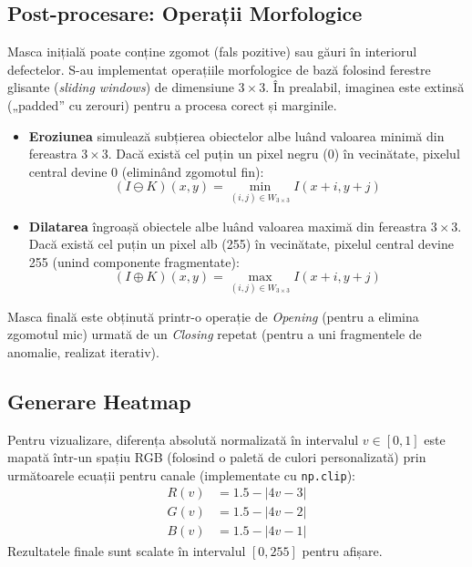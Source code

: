 \documentclass[12pt, a4paper]{article}
\begin{document}
\subsection{Post-procesare: Operații Morfologice}
Masca inițială poate conține zgomot (fals pozitive) sau găuri în interiorul defectelor. S-au implementat operațiile morfologice de bază folosind ferestre glisante (\textit{sliding windows}) de dimensiune $3 \times 3$. În prealabil, imaginea este extinsă („padded” cu zerouri) pentru a procesa corect și marginile.
\begin{itemize}
    \item \textbf{Eroziunea} simulează subțierea obiectelor albe luând valoarea minimă din fereastra $3 \times 3$. Dacă există cel puțin un pixel negru (0) în vecinătate, pixelul central devine 0 (eliminând zgomotul fin): 
    \begin{equation}
        (I \ominus K)(x, y) = \min_{(i,j) \in W_{3\times3}} I(x+i, y+j)
    \end{equation}
    \item \textbf{Dilatarea} îngroașă obiectele albe luând valoarea maximă din fereastra $3 \times 3$. Dacă există cel puțin un pixel alb (255) în vecinătate, pixelul central devine 255 (unind componente fragmentate):
    \begin{equation}
        (I \oplus K)(x, y) = \max_{(i,j) \in W_{3\times3}} I(x+i, y+j)
    \end{equation}
\end{itemize}
Masca finală este obținută printr-o operație de \textit{Opening} (pentru a elimina zgomotul mic) urmată de un \textit{Closing} repetat (pentru a uni fragmentele de anomalie, realizat iterativ).

\subsection{Generare Heatmap}
Pentru vizualizare, diferența absolută normalizată în intervalul $v \in [0, 1]$ este mapată într-un spațiu RGB (folosind o paletă de culori personalizată) prin următoarele ecuații pentru canale (implementate cu \texttt{np.clip}):
\begin{align}
    R(v) &= 1.5 - |4v - 3| \\
    G(v) &= 1.5 - |4v - 2| \\
    B(v) &= 1.5 - |4v - 1|
\end{align}
Rezultatele finale sunt scalate în intervalul $[0, 255]$ pentru afișare.
\end{document}
